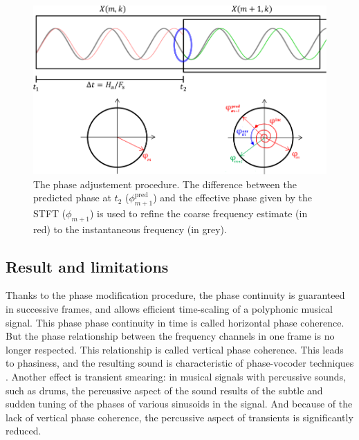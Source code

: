 \documentclass[letterpaper]{article}
\theoremstyle{definition}
\theoremstyle{remark}
\begin{document}
\begin{figure}
\includegraphics[width=\linewidth]{phase-unwrapping.png}
\caption{The phase adjustement procedure. The difference between the predicted
phase at \(t_2\) (\(\phi^{\text{pred}}_{m+1}\)) and the effective phase given by
the STFT (\(\phi_{m+1}\)) is used to refine the coarse frequency estimate (in
red) to the instantaneous frequency (in grey).}
\end{figure}

\subsection{Result and limitations}
Thanks to the phase modification procedure, the phase continuity is guaranteed
in successive frames, and allows efficient time-scaling of a polyphonic musical
signal. This phase phase continuity in time is called horizontal phase
coherence. But the phase relationship between the frequency channels in one
frame is no longer respected. This relationship is called vertical phase
coherence. This leads to phasiness, and the resulting sound is characteristic of
phase-vocoder techniques \citep{Laroche1999}. Another effect is transient
smearing: in musical signals with percussive sounds, such as drums, the
percussive aspect of the sound results of the subtle and sudden tuning of the
phases of various sinusoids in the signal. And because of the lack of vertical
phase coherence, the percussive aspect of transients is significantly reduced.

\paragraph{}
\end{document}

